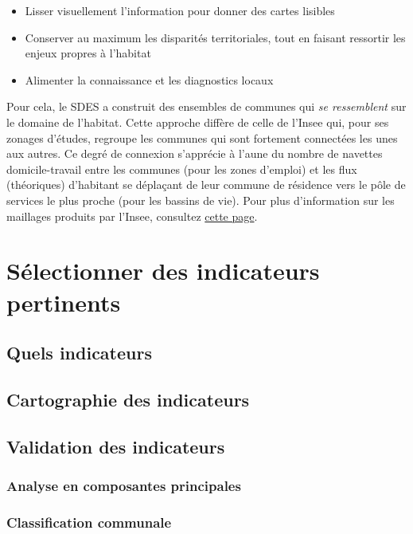 \documentclass[12pt, a4paper]{article}
\begin{document}
\begin{itemize}
\item Lisser visuellement l'information pour donner des cartes lisibles
\item Conserver au maximum les disparités territoriales, tout en faisant ressortir les enjeux propres à l'habitat
\item Alimenter la connaissance et les diagnostics locaux
\end{itemize}


Pour cela, le SDES a construit des ensembles de communes qui \emph{se ressemblent} sur le domaine de l'habitat. Cette approche diffère de celle de l'Insee qui, pour ses zonages d'études, regroupe les communes qui sont fortement connectées les unes aux autres. Ce degré de connexion s'apprécie à l'aune du nombre de navettes domicile-travail entre les communes (pour les zones d'emploi) et les flux (théoriques) d'habitant se déplaçant de leur commune de résidence vers le pôle de services le plus proche (pour les bassins de vie). Pour plus d'information sur les maillages produits par l'Insee, consultez \href{https://www.insee.fr/fr/information/2114631}{cette page}.

\section{Sélectionner des indicateurs pertinents}

\subsection{Quels indicateurs}




\subsection{Cartographie des indicateurs}

\subsection{Validation des indicateurs}

\subsubsection{Analyse en composantes principales}

\subsubsection{Classification communale}
\end{document}
